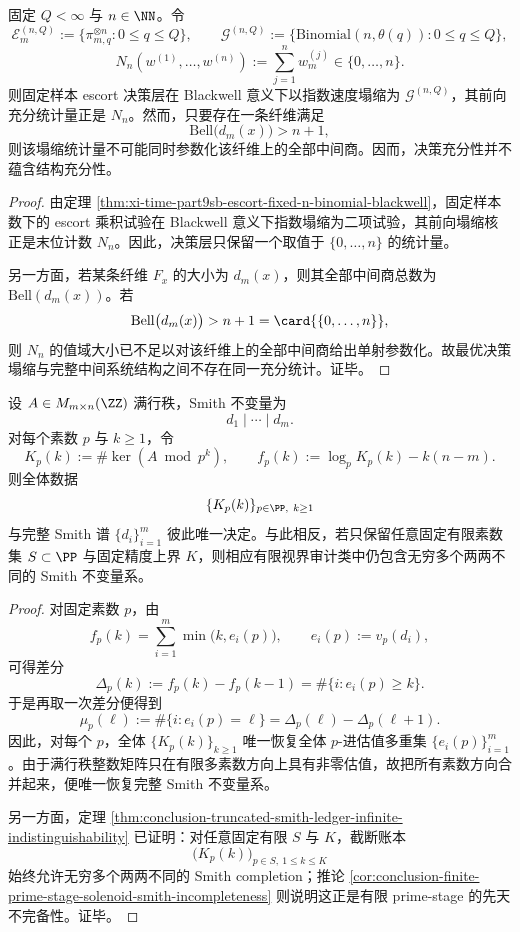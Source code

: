 \begin{theorem}\label{thm:conclusion-blackwell-collapse-vs-intermediate-system-explosion}
固定 \(Q<\infty\) 与 \(n\in\NN\)。令
\[
\mathcal E_m^{(n,Q)}:=\{\pi_{m,q}^{\otimes n}:0\le q\le Q\},
\qquad
\mathcal G^{(n,Q)}:=\{\mathrm{Binomial}(n,\theta(q)):0\le q\le Q\},
\]
\[
N_n(w^{(1)},\dots,w^{(n)}):=\sum_{j=1}^{n}w_m^{(j)}\in\{0,\dots,n\}.
\]
则固定样本 escort 决策层在 Blackwell 意义下以指数速度塌缩为 \(\mathcal G^{(n,Q)}\)，其前向充分统计量正是 \(N_n\)。然而，只要存在一条纤维满足
\[
\mathrm{Bell}\bigl(d_m(x)\bigr)>n+1,
\]
则该塌缩统计量不可能同时参数化该纤维上的全部中间商。因而，决策充分性并不蕴含结构充分性。
\end{theorem}
\begin{proof}
由定理 \ref{thm:xi-time-part9sb-escort-fixed-n-binomial-blackwell}，固定样本数下的 escort 乘积试验在 Blackwell 意义下指数塌缩为二项试验，其前向塌缩核正是末位计数 \(N_n\)。因此，决策层只保留一个取值于 \(\{0,\dots,n\}\) 的统计量。

另一方面，若某条纤维 \(F_x\) 的大小为 \(d_m(x)\)，则其全部中间商总数为 \(\mathrm{Bell}(d_m(x))\)。若
\[
\mathrm{Bell}\bigl(d_m(x)\bigr)>n+1=\card{\{0,\dots,n\}},
\]
则 \(N_n\) 的值域大小已不足以对该纤维上的全部中间商给出单射参数化。故最优决策塌缩与完整中间系统结构之间不存在同一充分统计。证毕。
\end{proof}

\begin{theorem}\label{thm:conclusion-smith-audit-completeness-requires-cofinal-prime-and-depth}
设 \(A\in M_{m\times n}(\ZZ)\) 满行秩，Smith 不变量为
\[
d_1\mid\cdots\mid d_m.
\]
对每个素数 \(p\) 与 \(k\ge 1\)，令
\[
K_p(k):=\#\ker(A\bmod p^k),
\qquad
f_p(k):=\log_pK_p(k)-k(n-m).
\]
则全体数据
\[
\{K_p(k)\}_{p\in\PP,\ k\ge 1}
\]
与完整 Smith 谱 \(\{d_i\}_{i=1}^{m}\) 彼此唯一决定。与此相反，若只保留任意固定有限素数集 \(S\subset\PP\) 与固定精度上界 \(K\)，则相应有限视界审计类中仍包含无穷多个两两不同的 Smith 不变量系。
\end{theorem}
\begin{proof}
对固定素数 \(p\)，由
\[
f_p(k)=\sum_{i=1}^{m}\min\bigl(k,e_i(p)\bigr),
\qquad
e_i(p):=v_p(d_i),
\]
可得差分
\[
\Delta_p(k):=f_p(k)-f_p(k-1)=\#\{i:e_i(p)\ge k\}.
\]
于是再取一次差分便得到
\[
\mu_p(\ell):=\#\{i:e_i(p)=\ell\}
=
\Delta_p(\ell)-\Delta_p(\ell+1).
\]
因此，对每个 \(p\)，全体 \(\{K_p(k)\}_{k\ge 1}\) 唯一恢复全体 \(p\)-进估值多重集 \(\{e_i(p)\}_{i=1}^{m}\)。由于满行秩整数矩阵只在有限多素数方向上具有非零估值，故把所有素数方向合并起来，便唯一恢复完整 Smith 不变量系。

另一方面，定理 \ref{thm:conclusion-truncated-smith-ledger-infinite-indistinguishability} 已证明：对任意固定有限 \(S\) 与 \(K\)，截断账本
\[
\bigl(K_p(k)\bigr)_{p\in S,\ 1\le k\le K}
\]
始终允许无穷多个两两不同的 Smith completion；推论 \ref{cor:conclusion-finite-prime-stage-solenoid-smith-incompleteness} 则说明这正是有限 prime-stage 的先天不完备性。证毕。
\end{proof}

